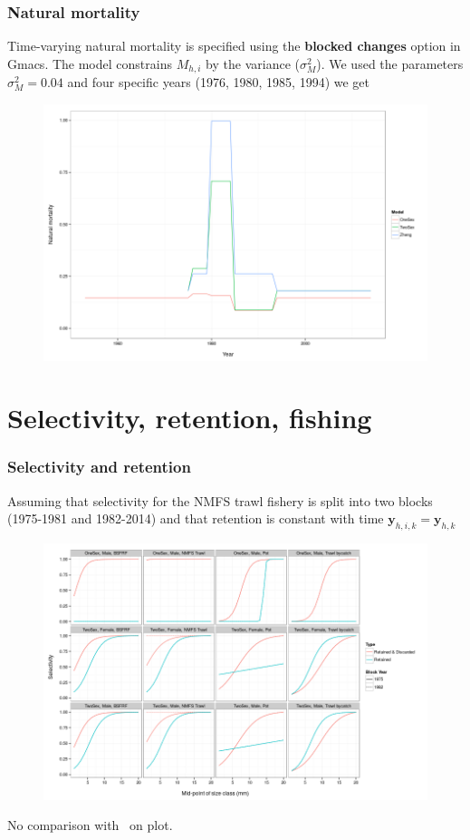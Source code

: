 \documentclass{beamer}
\begin{document}

\begin{frame}
\frametitle{Natural mortality}
Time-varying natural mortality is specified using the {\bf blocked changes}
option in Gmacs. The model constrains $M_{h,i}$ by the variance
($\sigma^2_M$). We used the parameters $\sigma^2_M = 0.04$ and four specific
years (1976, 1980, 1985, 1994) we get
\begin{figure}[!htbp]
  \centering
  \includegraphics[width=0.65\linewidth]{figure/natural_mortality-1.png}
\end{figure}
\end{frame}


\section{Selectivity, retention, fishing}


\begin{frame}
\frametitle{Selectivity and retention}
Assuming that selectivity for the NMFS trawl fishery is split into two blocks
(1975-1981 and 1982-2014) and that retention is constant with time
$\boldsymbol{y}_{h,i,k} = \boldsymbol{y}_{h,k}$
\begin{figure}[!htbp]
  \centering
  \includegraphics[width=0.6\linewidth]{figure/selectivity-1.png}
\end{figure}
No comparison with~\citet{zheng_bristol_2015} on plot.
\end{frame}
\end{document}
